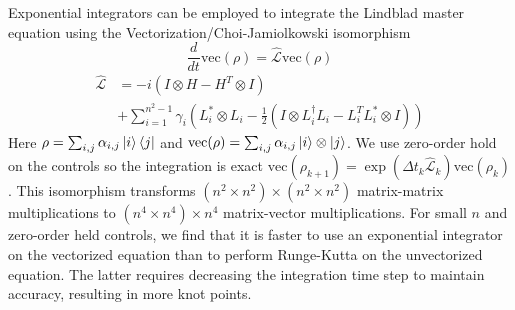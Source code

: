 Exponential integrators can be employed to integrate the Lindblad master equation
using the Vectorization/Choi-Jamiolkowski isomorphism \cite{Landi2018}
\begin{equation}
  \frac{d}{dt} \textrm{vec}({\rho}) = \hat{\mathcal{L}} \textrm{vec}({\rho})
\end{equation}
\begin{equation}
  \begin{aligned}
    \hat{\mathcal{L}} &= -i(I \otimes H - H^{T} \otimes I)\\
    &+ \sum_{i = 1}^{n^{2} - 1} \gamma_{i}
    (L_{i}^{*} \otimes L_{i} - \frac{1}{2} (I \otimes L_{i}^{\dagger}L_{i}
    - L_{i}^{T}L_{i}^{*} \otimes I))
  \end{aligned}
\end{equation}
Here $\rho = \sum_{i, j} \alpha_{i, j} \ket{i}\bra{j}$
and $\textrm{vec}(\rho) = \sum_{i, j} \alpha_{i, j} \ket{i} \otimes \ket{j}$.
We use zero-order hold on the controls so the integration is exact
$\textrm{vec}(\rho_{k + 1}) = \exp(\Delta t_{k} \hat{\mathcal{L}}_{k}) \textrm{vec}(\rho_{k})$.
This isomorphism transforms $(n^{2} \times n^{2}) \times (n^{2} \times n^{2})$
matrix-matrix multiplications to $(n^{4} \times n^{4}) \times n^{4}$ matrix-vector
multiplications. For small $n$ and zero-order held controls, we find that it is
faster to use an exponential integrator on the vectorized equation than to perform
Runge-Kutta on the unvectorized equation. The latter requires decreasing the integration
time step to maintain accuracy, resulting in more knot points.

